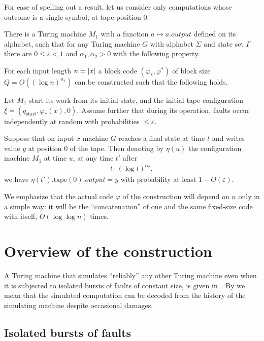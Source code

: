 \documentclass[12pt]{memoir}
\renewcommand{\le}{\leq}
\newcommand{\Output}{\mathit{output}}
\newcommand{\Q}{Q}
\newcommand{\start}{\mathrm{start}}
\newcommand{\tape}{\mathrm{tape}}
\begin{document}
For ease of spelling out a result, let us consider only computations whose outcome
is a single symbol, at tape position 0.

\begin{theorem}\label{thm:main-main}
There is a Turing machine \( M_{1} \) with a 
function \( a\mapsto a.\Output \) defined on its alphabet, 
such that
for any Turing machine \( G \) with alphabet \( \Sigma \) and state set \( \Gamma \)
there are \( 0\le\varepsilon <1 \) and \( \alpha_{1},\alpha_{2}>0 \) 
with the following property.

For each input length \( n=\lvert x \rvert \) a block code
\( (\varphi_{*}, \varphi^{*}) \) of block size \( \Q=O((\log n)^{\alpha_{1}}) \) can be constructed 
such that the following holds.

Let \( M_{1} \) start its work from its initial state,
and the initial tape configuration \( \xi=(q_{\start},\varphi_{*}(x),0) \).
Assume further that
during its operation, faults occur independently at random
with probabilities \( \le \varepsilon \).

Suppose that on input \( x \) machine \( G \) reaches a final state at time \( t \) and writes
value \( y \) at position 0 of the tape.
Then denoting by \( \eta(u) \) the configuration machine \( M_{1} \) at time \( u \),
at any time \( t' \) after
 \begin{align*}
   t\cdot (\log t)^{\alpha_{2}},
 \end{align*}
we have \( \eta(t').\tape(0).\Output= y \)
with probability at least \( 1 - O(\varepsilon) \).
\end{theorem}

We emphasize that the actual
code \( \varphi \) of the construction will depend on \( n \) only in a simple way:
it will be the ``concatenation'' of one and the same fixed-size
code with itself, \( O(\log\log n) \) times.


\section{Overview of the construction}

A Turing machine that simulates ``reliably'' any other
Turing machine even when it is subjected to isolated bursts of faults of constant size,
is given in~\cite{burstyTuring13}.
By  we mean that the 
simulated computation can be decoded from the history
of the simulating machine despite occasional damages.


\subsection{Isolated bursts of faults}\label{sec:bursts}
\end{document}

